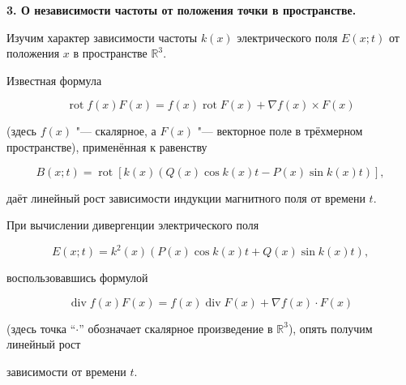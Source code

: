 






\smallskip



{\bf 3. О независимости частоты от положения точки в пространстве.} 


 Изучим характер зависимости частоты  $k(x)$ электрического поля $E(x;t)$ от положения $x$ в пространстве $\mathbb R^3$. 

Известная формула

$$

\mathop{\mathrm{rot}} f(x)F(x) = f(x)\mathop{\mathrm{rot}} F(x) + \nabla f(x)\times F(x)

$$ 

(здесь $f(x)$ "--- скалярное, а $F(x)$ "--- векторное поле в трёхмерном пространстве), применённая к равенству 

$$

B(x;t) = \mathop{\mathrm{rot}} [k(x)(Q(x)\cos k(x)t - P(x)\sin k(x)t)],

$$

даёт линейный рост зависимости индукции магнитного поля от времени $t$. 



При вычислении дивергенции электрического поля

$$

E(x;t) = k^2(x)(P(x)\cos k(x)t + Q(x)\sin k(x)t),

$$ 

воспользовавшись формулой 

$$

\mathop{\mathrm{div}} f(x)F(x) = f(x)\mathop{\mathrm{div}} F(x) + \nabla f(x)\cdot F(x)

$$

(здесь точка ``$\cdot$'' обозначает скалярное произведение в $\mathbb R^3$), опять получим линейный рост 

зависимости от времени $t$. 



